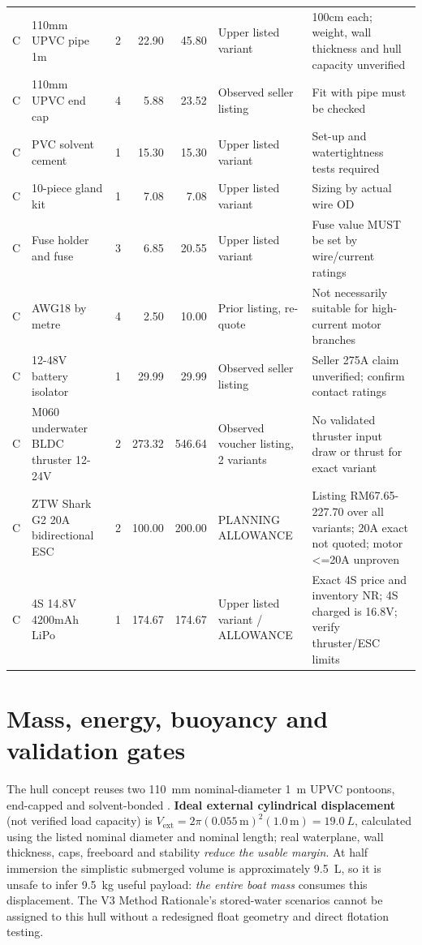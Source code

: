 \begin{longtable}{L{12mm}L{47mm}r r r L{31mm}L{36mm}}
C & 110mm UPVC pipe 1m \cite{pipe} & 2 & 22.90 & 45.80 & Upper listed variant & 100cm each; weight, wall thickness and hull capacity unverified \\
C & 110mm UPVC end cap \cite{cap} & 4 & 5.88 & 23.52 & Observed seller listing & Fit with pipe must be checked \\
C & PVC solvent cement \cite{glue} & 1 & 15.30 & 15.30 & Upper listed variant & Set-up and watertightness tests required \\
C & 10-piece gland kit \cite{gland} & 1 & 7.08 & 7.08 & Upper listed variant & Sizing by actual wire OD \\
C & Fuse holder and fuse \cite{fuse} & 3 & 6.85 & 20.55 & Upper listed variant & Fuse value MUST be set by wire/current ratings \\
C & AWG18 by metre \cite{wire} & 4 & 2.50 & 10.00 & Prior listing, re-quote & Not necessarily suitable for high-current motor branches \\
C & 12-48V battery isolator \cite{kill} & 1 & 29.99 & 29.99 & Observed seller listing & Seller 275A claim unverified; confirm contact ratings \\
C & M060 underwater BLDC thruster 12-24V \cite{m060Shop} & 2 & 273.32 & 546.64 & Observed voucher listing, 2 variants & No validated thruster input draw or thrust for exact variant \\
C & ZTW Shark G2 20A bidirectional ESC \cite{ztwShop} & 2 & 100.00 & 200.00 & PLANNING ALLOWANCE & Listing RM67.65-227.70 over all variants; 20A exact not quoted; motor <=20A unproven \\
C & 4S 14.8V 4200mAh LiPo \cite{bat4Shopee} & 1 & 174.67 & 174.67 & Upper listed variant / ALLOWANCE & Exact 4S price and inventory NR; 4S charged is 16.8V; verify thruster/ESC limits \\
\end{longtable}
\normalsize
\section{Mass, energy, buoyancy and validation gates}
The hull concept reuses two \SI{110}{mm} nominal-diameter \SI{1}{m} UPVC pontoons, end-capped and solvent-bonded \cite{pipe,cap,glue}. \textbf{Ideal external cylindrical displacement} (not verified load capacity) is $V_{\mathrm{ext}}=2\pi (0.055\,\mathrm{m})^2 (1.0\,\mathrm{m})=\SI{19.0}{L}$, calculated using the listed nominal diameter and nominal length; real waterplane, wall thickness, caps, freeboard and stability \emph{reduce the usable margin}. At half immersion the simplistic submerged volume is approximately \SI{9.5}{L}, so it is unsafe to infer \SI{9.5}{kg} useful payload: \emph{the entire boat mass} consumes this displacement. The V3 Method Rationale's stored-water scenarios cannot be assigned to this hull without a redesigned float geometry and direct flotation testing.


